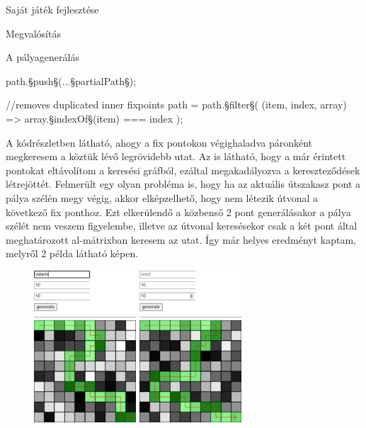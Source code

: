 \begin{MyChapter}{Saját játék fejlesztése}
\begin{MySection}{Megvalósítás}
\begin{MySubSection}{A pályagenerálás}
\begin{javascript}
{	path.§\color{jsMethod}push§(...§\color{jsConst}partialPath§);
}

//removes duplicated inner fixpoints
path = path.§\color{jsMethod}filter§(
	(item, index, array) => array.§\color{jsMethod}indexOf§(item) === index
);
			\end{javascript}
			A kódrészletben látható, ahogy a fix pontokon végighaladva páronként megkeresem a köztük lévő legrövidebb utat. Az is látható, hogy a már érintett pontokat eltávolítom a keresési gráfból, ezáltal megakadályozva a kereszteződések létrejöttét. Felmerült egy olyan probléma is, hogy ha az aktuális útszakasz pont a pálya szélén megy végig, akkor elképzelhető, hogy nem létezik útvonal a következő fix ponthoz. Ezt elkerülendő a közbenső 2 pont generálásakor a pálya szélét nem veszem figyelembe, illetve az útvonal keresésekor csak a két pont által meghatározott al-mátrixban keresem az utat. Így már helyes eredményt kaptam, melyről 2 példa látható  képen.
			
			\begin{figure}[H]
				\centering
				\includegraphics[width=0.34\textwidth]{kepek/map/generate-example-2.png}
				\hspace{5mm}
				\includegraphics[width=0.34\textwidth]{kepek/map/generate-example-1.png}
				

\end{figure}
\end{MySubSection}
\end{MySection}
\end{MyChapter}
